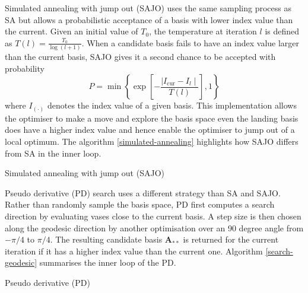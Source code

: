 Simulated annealing with jump out (SAJO)
\citep{kirkpatrick1983optimization, bertsimas1993simulated} uses the
same sampling process as SA but allows a probabilistic acceptance of a
basis with lower index value than the current. Given an initial value of
\(T_0\), the temperature at iteration \(l\) is defined as
\(T(l) = \frac{T_0}{\log(l + 1)}\). When a candidate basis fails to have
an index value larger than the current basis, SAJO gives it a second
chance to be accepted with probability
\[P= \min\left\{\exp\left[-\frac{\mid I_{\text{cur}} - I_{l} \mid}{T(l)}\right],1\right\}\]
where \(I_{(\cdot)}\) denotes the index value of a given basis. This
implementation allows the optimiser to make a move and explore the basis
space even the landing basis does have a higher index value and hence
enable the optimiser to jump out of a local optimum. The algorithm
\ref{simulated-annealing} highlights how SAJO differs from SA in the
inner loop.

\begin{algorithm}
\SetAlgoLined
{}
  \caption{Simulated annealing with jump out (SAJO)}
  \label{simulated-annealing}
\end{algorithm}

Pseudo derivative (PD) search \citep{cook1995grand} uses a different
strategy than SA and SAJO. Rather than randomly sample the basis space,
PD first computes a search direction by evaluating vases close to the
current basis. A step size is then chosen along the geodesic direction
by another optimisation over an 90 degree angle from \(-\pi/4\) to
\(\pi/4\). The resulting candidate basis \(\mathbf{A}_{**}\) is returned
for the current iteration if it has a higher index value than the
current one. Algorithm \ref{search-geodesic} summarises the inner loop
of the PD.

\begin{algorithm}
\SetAlgoLined
{}
\caption{Pseudo derivative (PD)}
\label{search-geodesic}
\end{algorithm}

